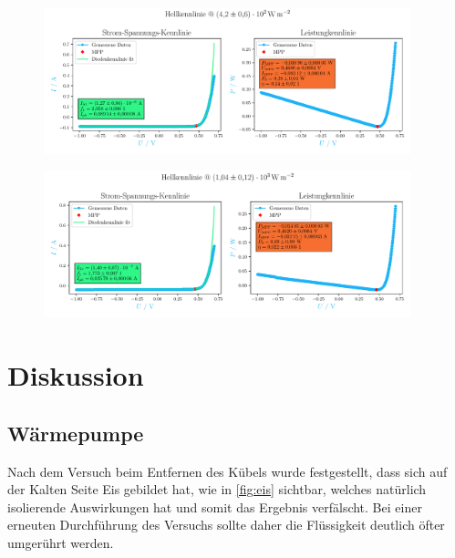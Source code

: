 \documentclass[12pt,english,ngerman]{scrartcl}
\begin{document}
\begin{figure}[H]
	\centering
	\includegraphics[width=0.95\textwidth]{figures/helllampe2.pdf}
	\caption{}\label{fig:ausw_kennlinie_hell_lampe2}
\end{figure}

\begin{figure}[H]
	\centering
	\includegraphics[width=0.95\textwidth]{figures/hellled.pdf}
	\caption{}\label{fig:ausw_kennlinie_hell_led}
\end{figure}

\section{Diskussion}\label{sec:diskussion}

\subsection{Wärmepumpe}


Nach dem Versuch beim Entfernen des Kübels wurde festgestellt, dass sich auf der Kalten Seite Eis gebildet hat,
wie in \autoref{fig:eis} sichtbar,
welches natürlich isolierende Auswirkungen hat und somit das Ergebnis verfälscht. Bei einer erneuten Durchführung 
des Versuchs sollte daher die Flüssigkeit deutlich öfter umgerührt werden.
\end{document}
